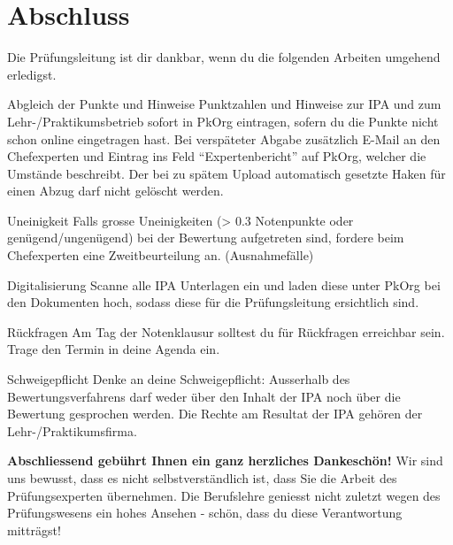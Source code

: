 \section{Abschluss}
Die Prüfungsleitung ist dir dankbar, wenn du die folgenden Arbeiten umgehend erledigst.

\begin{taskitemwithoutcomment}{Abgleich der Punkte und Hinweise}
  Punktzahlen und Hinweise zur IPA und zum Lehr-/Praktikumsbetrieb sofort in PkOrg eintragen, sofern du die Punkte nicht schon online eingetragen hast. Bei verspäteter Abgabe zusätzlich E-Mail an den Chefexperten und Eintrag ins Feld \enquote{Expertenbericht} auf PkOrg, welcher die Umstände beschreibt. Der bei zu spätem Upload automatisch gesetzte Haken für einen Abzug darf nicht gelöscht werden.
\end{taskitemwithoutcomment}
\begin{taskitemwithoutcomment}{Uneinigkeit}
  Falls grosse Uneinigkeiten (> 0.3 Notenpunkte oder genügend/ungenügend) bei der Bewertung aufgetreten sind, fordere beim Chefexperten eine Zweitbeurteilung an. (Ausnahmefälle)
\end{taskitemwithoutcomment}
\begin{taskitemwithoutcomment}{Digitalisierung}
  Scanne alle IPA Unterlagen ein und laden diese unter PkOrg bei den Dokumenten hoch, sodass diese für die Prüfungsleitung ersichtlich sind.
\end{taskitemwithoutcomment}
\begin{taskitemwithoutcomment}{Rückfragen}
  Am Tag der Notenklausur solltest du für Rückfragen erreichbar sein. Trage den Termin in deine Agenda ein.
\end{taskitemwithoutcomment}
\begin{taskitemwithoutcomment}{Schweigepflicht}
  Denke an deine Schweigepflicht: Ausserhalb des Bewertungsverfahrens darf weder über den Inhalt der IPA noch über die Bewertung gesprochen werden. Die Rechte am Resultat der IPA gehören der Lehr-/Praktikumsfirma.
\end{taskitemwithoutcomment}

\textbf{Abschliessend gebührt Ihnen ein ganz herzliches Dankeschön!}
Wir sind uns bewusst, dass es nicht selbstverständlich ist, dass Sie die Arbeit des Prüfungsexperten übernehmen. Die Berufslehre geniesst nicht zuletzt wegen des Prüfungswesens ein hohes Ansehen - schön, dass du diese Verantwortung mitträgst!